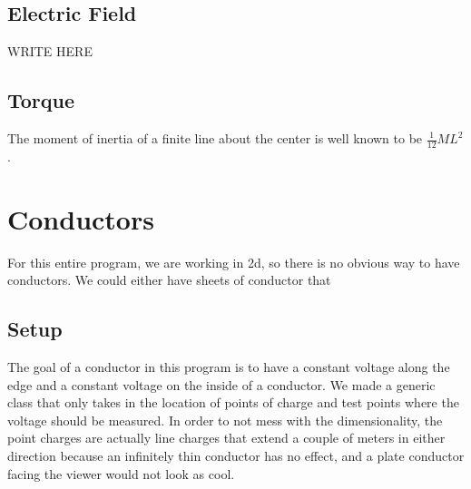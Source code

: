 \documentclass{article}
\begin{document}
\subsection{Electric Field}
WRITE HERE
\subsection{Torque}
The moment of inertia of a finite line about the center is well known to be $\frac{1}{12}ML^2$.



\section{Conductors}
For this entire program, we are working in 2d, so there is no obvious way to have conductors. We could either have sheets of conductor that
\subsection{Setup}
The goal of a conductor in this program is to have a constant voltage along the edge and a constant voltage on the inside of a conductor. We made a generic class that only takes in the location of points of charge and test points where the voltage should be measured. In order to not mess with the dimensionality, the point charges are actually line charges that extend a couple of meters in either direction because an infinitely thin conductor has no effect, and a plate conductor facing the viewer would not look as cool.
\end{document}
